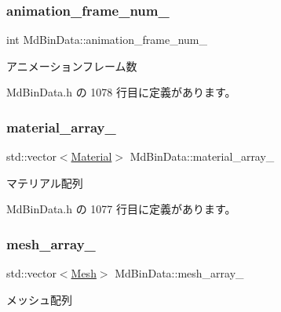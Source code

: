 \subsubsection{\texorpdfstring{animation\+\_\+frame\+\_\+num\+\_\+}{animation\_frame\_num\_}}
{\footnotesize\ttfamily int Md\+Bin\+Data\+::animation\+\_\+frame\+\_\+num\+\_\+\hspace{0.3cm}{\ttfamily [private]}}



アニメーションフレーム数 



 Md\+Bin\+Data.\+h の 1078 行目に定義があります。

\mbox{\label{class_md_bin_data_a2e418d4749d2154ca1c22cdb8ee99740}} 
\subsubsection{\texorpdfstring{material\+\_\+array\+\_\+}{material\_array\_}}
{\footnotesize\ttfamily std\+::vector$<$\mbox{\hyperlink{class_md_bin_data_1_1_material}{Material}}$>$ Md\+Bin\+Data\+::material\+\_\+array\+\_\+\hspace{0.3cm}{\ttfamily [private]}}



マテリアル配列 



 Md\+Bin\+Data.\+h の 1077 行目に定義があります。

\mbox{\label{class_md_bin_data_aefce3cdcd6dcdf388c936ade62c6b9fa}} 
\subsubsection{\texorpdfstring{mesh\+\_\+array\+\_\+}{mesh\_array\_}}
{\footnotesize\ttfamily std\+::vector$<$\mbox{\hyperlink{class_md_bin_data_1_1_mesh}{Mesh}}$>$ Md\+Bin\+Data\+::mesh\+\_\+array\+\_\+\hspace{0.3cm}{\ttfamily [private]}}



メッシュ配列 



